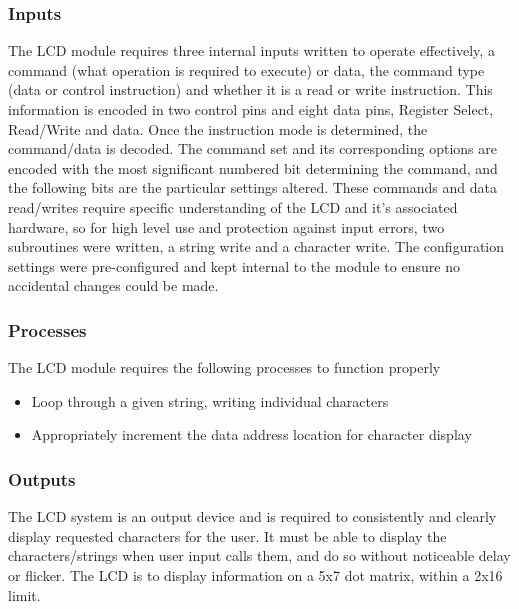 \documentclass[]{report}
\begin{document}
\subsubsection{Inputs}
The LCD module requires three internal inputs written to operate effectively, a command (what operation is required to execute) or data, the command type (data or control instruction) and whether it is a read or write instruction. \newline
This information is encoded in two control pins and eight data pins, Register Select, Read/Write and data. Once the instruction mode is determined, the command/data is decoded. The command set and its corresponding options are encoded with the most significant numbered bit determining the command, and the following bits are the particular settings altered.\newline
These commands and data read/writes require specific understanding of the LCD and it's associated hardware, so for high level use and protection against input errors, two subroutines were written, a string write and a character write. The configuration settings were pre-configured and kept internal to the module to ensure no accidental changes could be made.

\subsubsection{Processes}
The LCD module requires the following processes to function properly
\begin{itemize}
	\item Loop through a given string, writing individual characters
	\item Appropriately increment the data address location for character display
\end{itemize}
\subsubsection{Outputs}
The LCD system is an output device and is required to consistently and clearly display requested characters for the user. It must be able to display the characters/strings when user input calls them, and do so without noticeable delay or flicker. \newline
The LCD is to display information on a 5x7 dot matrix, within a 2x16 limit.
\end{document}
